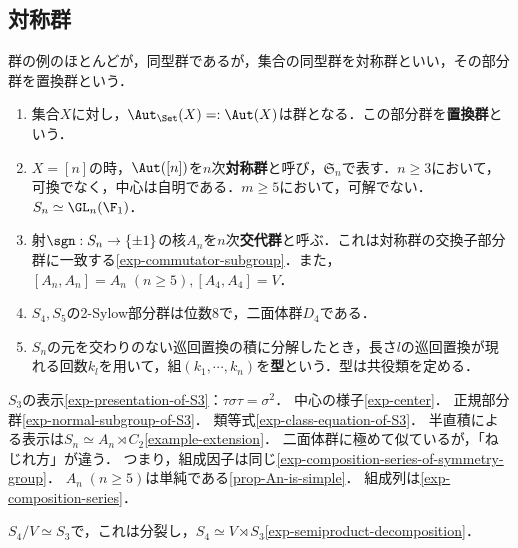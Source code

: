 \documentclass[uplatex,dvipdfmx]{jsreport}
\begin{document}
\subsection{対称群}

\begin{tcolorbox}[colframe=ForestGreen, colback=ForestGreen!10!white,breakable,colbacktitle=ForestGreen!40!white,coltitle=black,fonttitle=\bfseries\sffamily,
title=対称群＝順序数の変換群]
    群の例のほとんどが，同型群であるが，集合の同型群を対称群といい，その部分群を置換群という．
\end{tcolorbox}

\begin{example}\mbox{}
    \begin{enumerate}
        \item 集合$X$に対し，$\Aut_\Set(X)=:\Aut(X)$は群となる．この部分群を\textbf{置換群}という．
        \item $X=[n]$の時，$\Aut([n])$を$n$次\textbf{対称群}と呼び，$\mathfrak{S}_n$で表す．$n\ge 3$において，可換でなく，中心は自明である．$m\ge 5$において，可解でない．$S_n\simeq\GL_n(\F_1)$．
        \item 射$\sgn:S_n\to\{\pm 1\}$の核$A_n$を$n$次\textbf{交代群}と呼ぶ．これは対称群の交換子部分群に一致する\ref{exp-commutator-subgroup}．また，$[A_n,A_n]=A_n\;(n\ge 5),[A_4,A_4]=V$．
        \item $S_4,S_5$の2-Sylow部分群は位数8で，二面体群$D_4$である．
        \item $S_n$の元を交わりのない巡回置換の積に分解したとき，長さ$l$の巡回置換が現れる回数$k_l$を用いて，組$(k_1,\cdots,k_n)$を\textbf{型}という．型は共役類を定める．
    \end{enumerate}
\end{example}

\begin{example}[$S_3$]
    $S_3$の表示\ref{exp-presentation-of-S3}：$\tau\sigma\tau=\sigma^2$．
    中心の様子\ref{exp-center}．
    正規部分群\ref{exp-normal-subgroup-of-S3}．
    類等式\ref{exp-class-equation-of-S3}．
    半直積による表示は$S_n\simeq A_n\rtimes C_2$\ref{example-extension}．
    二面体群に極めて似ているが，「ねじれ方」が違う．
    つまり，組成因子は同じ\ref{exp-composition-series-of-symmetry-group}．
    $A_n\;(n\ge 5)$は単純である\ref{prop-An-is-simple}．
    組成列は\ref{exp-composition-series}．
\end{example}

\begin{example}[$S_4$]
    $S_4/V\simeq S_3$で，これは分裂し，$S_4\simeq V\rtimes S_3$\ref{exp-semiproduct-decomposition}．
\end{example}
\end{document}
